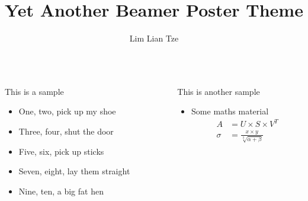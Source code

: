 \documentclass{beamer}
\author[liantze@gmail.com]{Lim Lian Tze}
\title{Yet Another Beamer Poster Theme}
\institute{Multimedia University, Malaysia}
\begin{document}
\begin{frame}\centering

\begin{columns}[T]
\begin{column}{.46\textwidth}
\begin{block}{This is a sample}
\begin{itemize}
\item One, two, pick up my shoe
\item Three, four, shut the door
\item Five, six, pick up sticks
\item Seven, eight, lay them straight
\item Nine, ten, a big fat hen
\end{itemize}
\end{block}
\end{column}
\begin{column}{.46\textwidth}
\begin{block}{This is another sample}
\begin{itemize}
\item Some maths material
\begin{align}
A &= U \times S \times V^T\\
\sigma &= \frac{x\times y}{\sqrt[3]{\alpha + \beta}}
\end{align}
\end{itemize}
\end{block}
\end{column}
\end{columns}

\end{frame}
\end{document}
